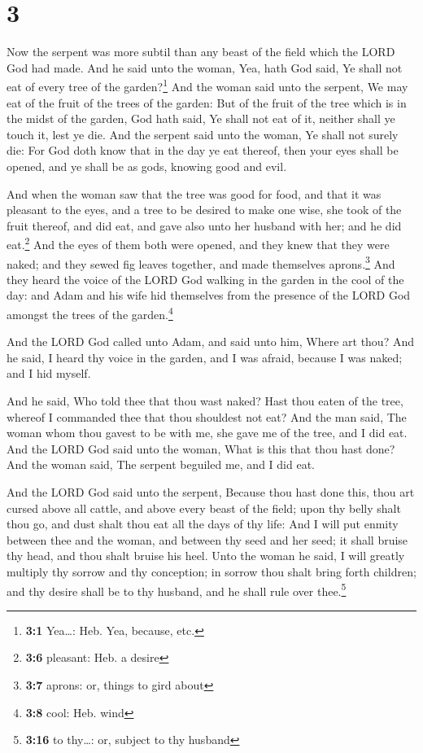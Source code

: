 \hypertarget{section-2}{%
\section{3}\label{section-2}}

 Now the serpent was more subtil than any beast of the
field which the LORD God had made. And he said unto the woman, Yea, hath
God said, Ye shall not eat of every tree of the garden?\footnote{\textbf{3:1}
  Yea\ldots: Heb. Yea, because, etc.}  And the woman said
unto the serpent, We may eat of the fruit of the trees of the garden:
 But of the fruit of the tree which is in the midst of the
garden, God hath said, Ye shall not eat of it, neither shall ye touch
it, lest ye die.  And the serpent said unto the woman, Ye
shall not surely die:  For God doth know that in the day
ye eat thereof, then your eyes shall be opened, and ye shall be as gods,
knowing good and evil.

 And when the woman saw that the tree was good for food,
and that it was pleasant to the eyes, and a tree to be desired to make
one wise, she took of the fruit thereof, and did eat, and gave also unto
her husband with her; and he did eat.\footnote{\textbf{3:6} pleasant:
  Heb. a desire}  And the eyes of them both were opened,
and they knew that they were naked; and they sewed fig leaves together,
and made themselves aprons.\footnote{\textbf{3:7} aprons: or, things to
  gird about}  And they heard the voice of the LORD God
walking in the garden in the cool of the day: and Adam and his wife hid
themselves from the presence of the LORD God amongst the trees of the
garden.\footnote{\textbf{3:8} cool: Heb. wind}

 And the LORD God called unto Adam, and said unto him,
Where art thou?  And he said, I heard thy voice in the
garden, and I was afraid, because I was naked; and I hid myself.

 And he said, Who told thee that thou wast naked? Hast
thou eaten of the tree, whereof I commanded thee that thou shouldest not
eat?  And the man said, The woman whom thou gavest to be
with me, she gave me of the tree, and I did eat.  And the
LORD God said unto the woman, What is this that thou hast done? And the
woman said, The serpent beguiled me, and I did eat.

 And the LORD God said unto the serpent, Because thou
hast done this, thou art cursed above all cattle, and above every beast
of the field; upon thy belly shalt thou go, and dust shalt thou eat all
the days of thy life:  And I will put enmity between thee
and the woman, and between thy seed and her seed; it shall bruise thy
head, and thou shalt bruise his heel.  Unto the woman he
said, I will greatly multiply thy sorrow and thy conception; in sorrow
thou shalt bring forth children; and thy desire shall be to thy husband,
and he shall rule over thee.\footnote{\textbf{3:16} to thy\ldots: or,
  subject to thy husband}

